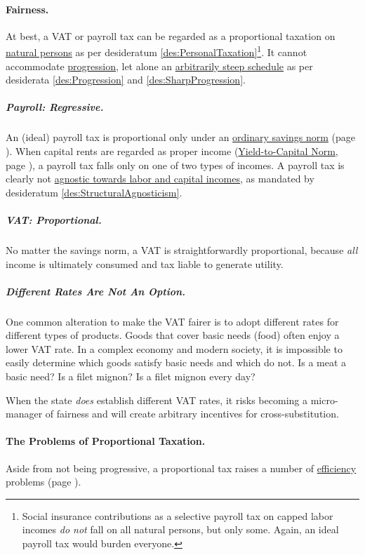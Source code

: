 \paragraph{Fairness.} At best, a VAT or payroll tax can be regarded as a proportional taxation on \hyperref[des:PersonalTaxation]{natural persons} as per desideratum \ref{des:PersonalTaxation}\footnote{
	Social insurance contributions as a selective payroll tax on capped labor incomes \emph{do not} fall on all natural persons, but only some. Again, an ideal payroll tax would burden everyone.}.
It cannot accommodate \hyperref[des:Progression]{progression}, let alone an \hyperref[des:SharpProgression]{arbitrarily steep schedule} as per  desiderata \ref{des:Progression} and \ref{des:SharpProgression}.

\subparagraph{Payroll: Regressive.} An (ideal) payroll tax is proportional only under an \hyperref[sec:OSN]{ordinary savings norm} (page \pageref{sec:OSN}). When capital rents are regarded as proper income (\hyperref[sec:Y2C]{Yield-to-Capital Norm}, page \pageref{sec:Y2C}), a payroll tax falls only on one of two types of incomes. A payroll tax is clearly not \hyperref[des:StructuralAgnosticism]{agnostic towards labor and capital incomes}, as mandated by desideratum \ref{des:StructuralAgnosticism}.

\subparagraph{VAT: Proportional.} No matter the savings norm, a VAT is straightforwardly proportional, because \emph{all} income is ultimately consumed and tax liable to generate utility.

\subparagraph{Different Rates Are Not An Option.} One common alteration to make the VAT fairer is to adopt different rates for different types of products. Goods that cover basic needs (food) often enjoy a lower VAT rate. In a complex economy and modern society, it is impossible to easily determine which goods satisfy basic needs and which do not. Is a meat a basic need? Is a filet mignon? Is a filet mignon every day?

When the state \emph{does} establish different VAT rates, it risks becoming a micro-manager of fairness and will create arbitrary incentives for cross-substitution.

\paragraph{The Problems of Proportional Taxation.} Aside from not being progressive, a proportional tax raises a number of \hyperref[sec:Efficiency]{efficiency} problems (page \pageref{sec:Efficiency}).

